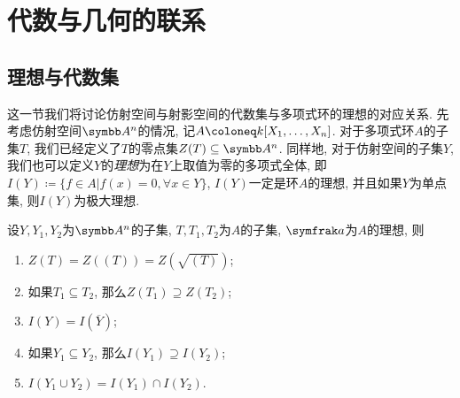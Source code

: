 
\section{代数与几何的联系}\label{sec:algebraandgeometry}


\subsection{理想与代数集}\label{sec:ag-ideal}

这一节我们将讨论仿射空间与射影空间的代数集与多项式环的理想的对应关系.
先考虑仿射空间$\AF^n$的情况, 记$A\coloneq \kk [X_1, \dotsc, X_n]$. 对于多项式环$A$的子集$T$, 我们已经定义了$T$的零点集$Z(T)\subseteq\AF^n$. 同样地, 对于仿射空间的子集$Y$, 我们也可以定义$Y$的\emph{理想}为在$Y$上取值为零的多项式全体, 即$I(Y)\coloneq \{f\in A\vert f(x)=0, \forall x\in Y\}$, $I(Y)$一定是环$A$的理想, 并且如果$Y$为单点集, 则$I(Y)$为极大理想.

\begin{propositionnoproof}\label{prop:affinegaloisconnectionclosedradicalpre}
  设$Y, Y_1, Y_2$为$\AF^n$的子集, $T, T_1, T_2$为$A$的子集, $\ideal{a}$为$A$的理想, 则
  \begin{enumerate}
    \item\label{enum:prop-affine-galois-connection-closed-radical-1} $Z(T)=Z((T))=Z(\sqrt{(T)})$;
    \item\label{enum:prop-affine-galois-connection-closed-radical-2} 如果$T_1\subseteq T_2$, 那么$Z(T_1)\supseteq Z(T_2)$;
    \item\label{enum:prop-affine-galois-connection-closed-radical-3} $I(Y)=I(\overline{Y})$;
    \item\label{enum:prop-affine-galois-connection-closed-radical-4} 如果$Y_1\subseteq Y_2$, 那么$I(Y_1)\supseteq I(Y_2)$;
    \item\label{enum:prop-affine-galois-connection-closed-radical-5} $I(Y_1\cup Y_2)=I(Y_1)\cap I(Y_2)$.
  \end{enumerate}
\end{propositionnoproof}

